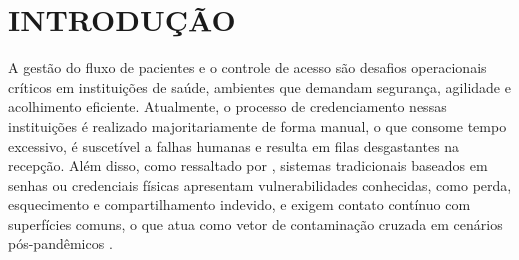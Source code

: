





\frenchspacing




\section{INTRODUÇÃO}
\label{sec:introducao}

A gestão do fluxo de pacientes e o controle de acesso são desafios operacionais críticos em instituições de saúde, ambientes que demandam segurança, agilidade e acolhimento eficiente. Atualmente, o processo de credenciamento nessas instituições é realizado majoritariamente de forma manual, o que consome tempo excessivo, é suscetível a falhas humanas e resulta em filas desgastantes na recepção. Além disso, como ressaltado por , sistemas tradicionais baseados em senhas ou credenciais físicas apresentam vulnerabilidades conhecidas, como perda, esquecimento e compartilhamento indevido, e exigem contato contínuo com superfícies comuns, o que atua como vetor de contaminação cruzada em cenários pós-pandêmicos \cite{10.1371/journal.pone.0257923}.

